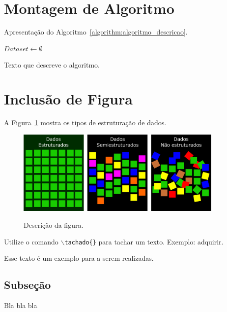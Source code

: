 \section{Montagem de Algoritmo}
\label{sec:algortimo}
Apresentação do Algoritmo~\ref{algorithm:algoritmo_descricao}.
\begin{algorithm}
	\SetInd{0.5cm}{0.1cm}
	\SetAlgoLined

	$ Dataset \leftarrow \emptyset $ \\
	\caption{Texto que descreve o algoritmo.}
	\label{algorithm:algoritmo_descricao}
\end{algorithm}

\section{Inclusão de Figura}
\label{sec:figura}
A Figura~\ref{fig:identificador_da_figura} mostra os tipos de estruturação de dados.
\begin{figure}[!ht]
	{\centering
		\caption{Descrição da figura.}
		\includegraphics[width=0.9\textwidth]{figuras/dados.png}
		\label{fig:identificador_da_figura}
	}
\end{figure}


Utilize o comando \texttt{$\backslash$tachado\{\}} para tachar um texto. Exemplo:  adquirir.

Esse texto é um exemplo para  a serem realizadas.

\subsection{Subseção}
\label{subsec:subseçao}
Bla bla bla
